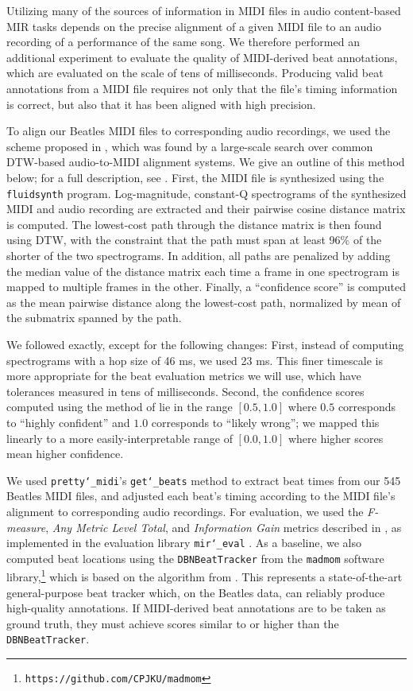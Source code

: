 \documentclass{article}
\begin{document}
Utilizing many of the sources of information in MIDI files in audio content-based MIR tasks depends on the precise alignment of a given MIDI file to an audio recording of a performance of the same song.
We therefore performed an additional experiment to evaluate the quality of MIDI-derived beat annotations, which are evaluated on the scale of tens of milliseconds.
Producing valid beat annotations from a MIDI file requires not only that the file's timing information is correct, but also that it has been aligned with high precision.

To align our Beatles MIDI files to corresponding audio recordings, we used the scheme proposed in \cite{raffel2016optimizing}, which was found by a large-scale search over common DTW-based audio-to-MIDI alignment systems.
We give an outline of this method below; for a full description, see \cite{raffel2016optimizing}.
First, the MIDI file is synthesized using the \texttt{fluidsynth} program.
Log-magnitude, constant-Q spectrograms of the synthesized MIDI and audio recording are extracted and their pairwise cosine distance matrix is computed.
The lowest-cost path through the distance matrix is then found using DTW, with the constraint that the path must span at least 96\% of the shorter of the two spectrograms.
In addition, all paths are penalized by adding the median value of the distance matrix each time a frame in one spectrogram is mapped to multiple frames in the other.
Finally, a ``confidence score'' is computed as the mean pairwise distance along the lowest-cost path, normalized by mean of the submatrix spanned by the path.

We followed \cite{raffel2016optimizing} exactly, except for the following changes:
First, instead of computing spectrograms with a hop size of 46 ms, we used 23 ms.
This finer timescale is more appropriate for the beat evaluation metrics we will use, which have tolerances measured in tens of milliseconds.
Second, the confidence scores computed using the method of \cite{raffel2016optimizing} lie in the range $[0.5, 1.0]$ where $0.5$ corresponds to ``highly confident'' and $1.0$ corresponds to ``likely wrong''; we mapped this linearly to a more easily-interpretable range of $[0.0, 1.0]$ where higher scores mean higher confidence.

We used \texttt{pretty\char`_midi}'s \texttt{get\char`_beats} method to extract beat times from our 545 Beatles MIDI files, and adjusted each beat's timing according to the MIDI file's alignment to corresponding audio recordings.
For evaluation, we used the {\em F-measure}, {\em Any Metric Level Total}, and {\em Information Gain} metrics described in \cite{davies2009evaluation}, as implemented in the evaluation library \texttt{mir\char`_eval} \cite{raffel2014mir_eval}.
As a baseline, we also computed beat locations using the \texttt{DBNBeatTracker} from the \texttt{madmom} software library,\footnote{\texttt{https://github.com/CPJKU/madmom}} which is based on the algorithm from \cite{bock2014multi}.
This represents a state-of-the-art general-purpose beat tracker which, on the Beatles data, can reliably produce high-quality annotations.
If MIDI-derived beat annotations are to be taken as ground truth, they must achieve scores similar to or higher than the \texttt{DBNBeatTracker}.
\end{document}
